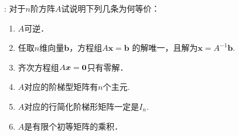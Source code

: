 \documentclass[UTF8]{ctexart}
\newcommand{\bx}{{\bm x}}
\newcommand{\bb}{{\bm b}}
\begin{document}
:
对于$n$阶方阵$A$试说明下列几条为何等价：
\begin{enumerate}
		\item $A$可逆．
		\item 任取$n$维向量$\bb$，方程组$A \bx = \bb$ 的解唯一，且解为$\bx = A^{-1}\bb$.
\item 齐次方程组$A\bx = {\bf 0}$只有零解．
\item $A$对应的阶梯型矩阵有$n$个主元.
\item $A$对应的行简化阶梯形矩阵一定是$I_n$.
\item $A$是有限个初等矩阵的乘积．
	\end{enumerate}
\end{document}
